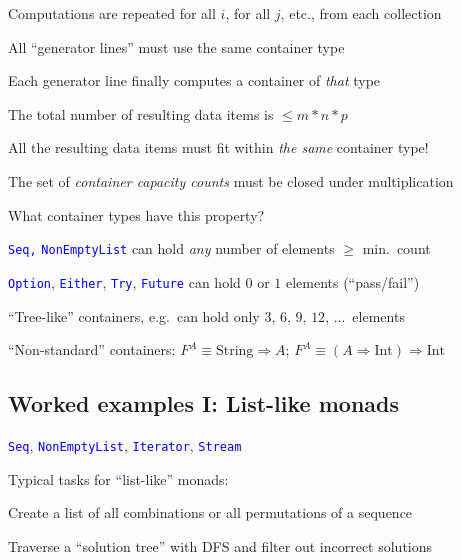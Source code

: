 Computations are repeated for all $i$, for all $j$, etc., from each
collection

All ``generator lines'' must use the same container type

Each generator line finally computes a container of \emph{that} type

The total number of resulting data items is $\leq m*n*p$\texttt{\textcolor{blue}{\footnotesize{} }}{\footnotesize\par}

All the resulting data items must fit within \emph{the same} container
type!

{\footnotesize{}The set of }\emph{\footnotesize{}container capacity
counts}{\footnotesize{} must be closed under multiplication}{\footnotesize\par}

What container types have this property?

\texttt{\textcolor{blue}{\footnotesize{}Seq,}} \texttt{\textcolor{blue}{\footnotesize{}NonEmptyList}}
\textendash{} can hold \emph{any} number of elements $\geq$ min.\ count

\texttt{\textcolor{blue}{\footnotesize{}Option}}, \texttt{\textcolor{blue}{\footnotesize{}Either}},
\texttt{\textcolor{blue}{\footnotesize{}Try}}, \texttt{\textcolor{blue}{\footnotesize{}Future}}
\textendash{} can hold $0$ or $1$ elements (``pass/fail'')

``Tree-like'' containers, e.g.\ can hold only $3$, $6$, $9$,
$12$, ...\ elements

``Non-standard'' containers: $F^{A}\equiv\text{String}\Rightarrow A$;
$F^{A}\equiv\left(A\Rightarrow\text{Int}\right)\Rightarrow\text{Int}$


\subsection{Worked examples I: List-like monads}

\texttt{\textcolor{blue}{\footnotesize{}Seq}}, \texttt{\textcolor{blue}{\footnotesize{}NonEmptyList}},
\texttt{\textcolor{blue}{\footnotesize{}Iterator}}, \texttt{\textcolor{blue}{\footnotesize{}Stream}}{\footnotesize\par}

Typical tasks for ``list-like'' monads:

Create a list of all combinations or all permutations of a sequence

Traverse a ``solution tree'' with DFS and filter out incorrect solutions

